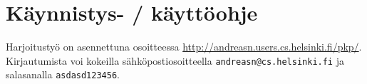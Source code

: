 \documentclass[a4paper,12pt, titlepage]{article}
\begin{document}
\section{Käynnistys- / käyttöohje}

Harjoitustyö on asennettuna osoitteessa \url{http://andreasn.users.cs.helsinki.fi/pkp/}.
Kirjautumista voi kokeilla sähköpostiosoitteella \verb|andreasn@cs.helsinki.fi|
ja salasanalla \verb|asdasd123456|.
\end{document}
